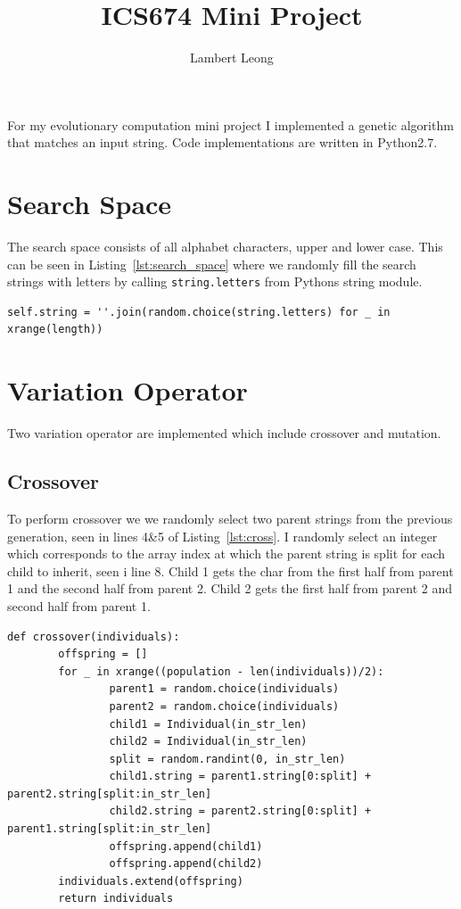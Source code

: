 \documentclass[12pt]{article}
\date{}
\title{ICS674 Mini Project}
\author{Lambert Leong}
\begin{document}

\maketitle

For my evolutionary computation mini project I implemented a genetic algorithm
that matches an input string.  Code implementations are written in Python2.7.

\section{Search Space}

The search space consists of all alphabet characters, upper and lower case.
This can be seen in Listing~\ref{lst:search_space} where we randomly fill the
search strings with letters by calling \texttt{string.letters} from Pythons
string module.

\begin{lstlisting}[caption = {Search space is all letter characters, upper and
lower case }, label = {lst:search_space}]
self.string = ''.join(random.choice(string.letters) for _ in xrange(length))
\end{lstlisting}

\section{Variation Operator}

Two variation operator are implemented which include crossover and mutation.

\subsection{Crossover}

To perform crossover we we randomly select two parent strings from the previous
generation, seen in lines 4\&5 of Listing~\ref{lst:cross}.  I randomly select an
integer which corresponds to the array index at which the parent string is split
for each child to inherit, seen i line 8.  Child 1 gets the char from the first
half from parent 1 and the second half from parent 2.  Child 2 gets the first
half from parent 2 and second half from parent 1.

\begin{lstlisting}[caption = {Crossover Function}, label = {lst:cross}]
def crossover(individuals):
        offspring = []
        for _ in xrange((population - len(individuals))/2):
                parent1 = random.choice(individuals)
                parent2 = random.choice(individuals)
                child1 = Individual(in_str_len)
                child2 = Individual(in_str_len)
                split = random.randint(0, in_str_len)
                child1.string = parent1.string[0:split] + parent2.string[split:in_str_len]
                child2.string = parent2.string[0:split] + parent1.string[split:in_str_len]
                offspring.append(child1)
                offspring.append(child2)
        individuals.extend(offspring)
        return individuals
\end{lstlisting}
\end{document}
